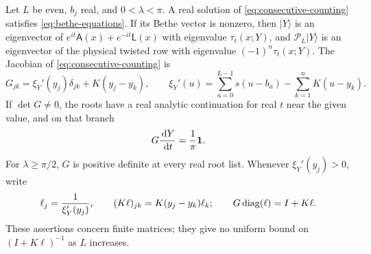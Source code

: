 \begin{lemma}\label{lem:bethe-data}
Let $L$ be even, $b_j$ real, and $0<\lambda<\pi$.
A real solution of \eqref{eq:consecutive-counting} satisfies
\eqref{eq:bethe-equations}.  If its Bethe vector is nonzero, then
$|Y\rangle$ is an eigenvector of
$e^{it}\mathsf A(x)+e^{-it}\mathsf L(x)$ with eigenvalue
$\tau_t(x;Y)$, and $\mathcal P_L|Y\rangle$ is an eigenvector of the
physical twisted row with eigenvalue $(-1)^n\tau_t(x;Y)$.
The Jacobian of \eqref{eq:consecutive-counting} is
\begin{equation}\label{eq:Gaudin-matrix}
 G_{jk}=\xi_Y'(y_j)\delta_{jk}+K(y_j-y_k),\qquad
 \xi_Y'(u)=\sum_{a=0}^{L-1}s(u-b_a)-\sum_{k=1}^nK(u-y_k).
\end{equation}
If $\det G\ne0$, the roots have a real analytic continuation for real
$t$ near the given value, and on that branch
\begin{equation}\label{eq:twist-root-derivative}
 G\frac{\,\mathrm d Y}{\,\mathrm d t}=\frac1\pi\mathbf1.
\end{equation}
For $\lambda\ge\pi/2$, $G$ is positive definite at every real root
list.  Whenever $\xi_Y'(y_j)>0$, write
\begin{equation}\label{eq:Gaudin-weights}
 \ell_j=\frac1{\xi_Y'(y_j)},\qquad
 (K\ell)_{jk}=K(y_j-y_k)\ell_k;
 \qquad G\operatorname{diag}(\ell)=I+K\ell.
\end{equation}
These assertions concern finite matrices; they give no uniform bound on
$(I+K\ell)^{-1}$ as $L$ increases.
\end{lemma}

